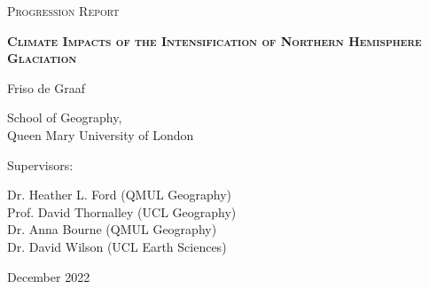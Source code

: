 \begin{titlepage}



\begin{center}

{\large \textsc{Progression Report}}

\vspace{1.0 cm}

\Huge \textsc{\textbf{Climate Impacts of the Intensification of Northern Hemisphere Glaciation}}

\vspace{1.0 cm}



{\LARGE Friso de Graaf} %


\vspace{0.5 cm}

\large 
School of Geography, \\
Queen Mary University of London


\vspace{2 cm}

\LARGE {
Supervisors:
}


\vspace{0.5 cm}

\large
Dr. Heather L. Ford (QMUL Geography)\\
Prof. David Thornalley (UCL Geography)\\
Dr. Anna Bourne (QMUL Geography)\\
Dr. David Wilson (UCL Earth Sciences)



\vspace{1cm}


December 2022 %


\end{center}



\end{titlepage}

\restoregeometry  %
